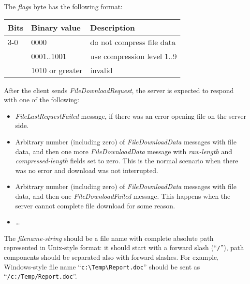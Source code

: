 \documentclass[a4paper]{article}
\newcommand{\typestr}[1]{\textit{#1}}
\begin{document}
The \typestr{flags} byte has the following format:

\begin{tabular}{l|l|l}
\hline
Bits & Binary value   & Description \\ \hline
3-0 & 0000            & do not compress file data \\
    & 0001..1001      & use compression level 1..9 \\
    & 1010 or greater & invalid \\
\hline
\end{tabular}


After the client sends \typestr{FileDownloadRequest}, the server is
expected to respond with one of the following:

\begin{itemize}

\item \typestr{FileLastRequestFailed} message, if there was an error
opening file on the server side.

\item Arbitrary number (including zero) of \typestr{FileDownloadData}
messages with file data, and then one more \typestr{FileDownloadData}
message with \typestr{raw-length} and \typestr{compressed-length}
fields set to zero. This is the normal scenario when there was no
error and download was not interrupted.

\item Arbitrary number (including zero) of \typestr{FileDownloadData}
messages with file data, and then one \typestr{FileDownloadFailed}
message. This happens when the server cannot complete file download
for some reason.

\item \dots

\end{itemize}


The \typestr{filename-string} should be a file name with complete
absolute path represented in Unix-style format: it should start with a
forward slash (``\verb|/|''), path components should be separated also
with forward slashes. For example, Windows-style file name
``\verb|c:\Temp\Report.doc|'' should be sent as
``\verb|/c:/Temp/Report.doc|''.
\end{document}
